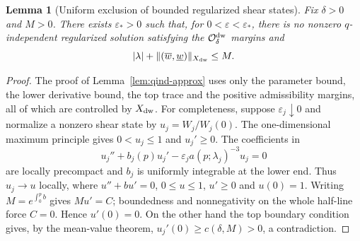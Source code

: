 \documentclass[11pt,reqno]{amsart}
\numberwithin{equation}{section}
\newtheorem{lemma}[theorem]{Lemma}
\theoremstyle{definition}
\theoremstyle{remark}
\begin{document}
\begin{lemma}[Uniform exclusion of bounded regularized shear states]
\label{lem5dw:qind-approx}
Fix $\delta>0$ and $M>0$.  There exists $\varepsilon_*>0$ such that,
for $0<\varepsilon<\varepsilon_*$, there is no nonzero
$q$-independent regularized solution satisfying the
$\mathcal O_\delta^{\rm dw}$ margins and
\[
 |\lambda|+\|(\overline w,\underline w)\|_{X_{\rm dw}}\le M.
\]
\end{lemma}
\begin{proof}
The proof of Lemma~\ref{lem:qind-approx} uses only the parameter bound,
the lower derivative bound, the top trace and the positive admissibility
margins, all of which are controlled by $X_{\rm dw}$.  For completeness,
suppose $\varepsilon_j\downarrow0$ and normalize a nonzero shear state
by $u_j=W_j/W_j(0)$.  The one-dimensional maximum principle gives
$0<u_j\le1$ and $u_j'\ge0$.  The coefficients in
\[
 u_j''+b_j(p)u_j'-\varepsilon_j a(p;\lambda_j)^{-3}u_j=0
\]
are locally precompact and $b_j$ is uniformly integrable at the lower
end.  Thus $u_j\to u$ locally, where
$u''+bu'=0$, $0\le u\le1$, $u'\ge0$ and $u(0)=1$.  Writing
$M=e^{\int_0^pb}$ gives $Mu'=C$; boundedness and nonnegativity on the
whole half-line force $C=0$.  Hence $u'(0)=0$.  On the other hand the
top boundary condition gives, by the mean-value theorem,
$u_j'(0)\ge c(\delta,M)>0$, a contradiction.
\end{proof}
\end{document}
